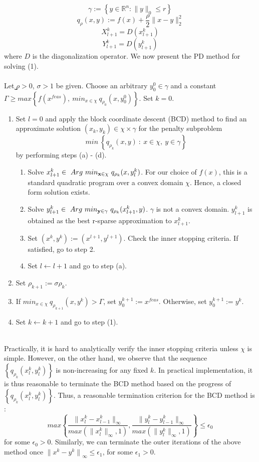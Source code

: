 \documentclass[letterpaper, 10 pt, conference]{article}
\begin{document}
$$\gamma := \left\lbrace{y\in{\mathbb{R}^n}:\|y\|_0 \leq{r}}\right\rbrace$$
$$q_{\rho}(x,y):=f(x)+\frac{\rho}{2}\|x-y\|_{2}^{2}$$
$$X_{l+1}^k=D(x_{l+1}^k)$$
$$Y_{l+1}^k=D(y_{l+1}^k)$$
where $D$ is the diagonalization operator. We now present the PD method for solving (1).
\\ \\
Let ̺$\rho > 0$, $\sigma > 1$ be given. Choose an arbitrary $y_0^0\in{\gamma}$ and a constant $\Gamma\geq max\left\lbrace{f(x^{feas}),\ min_{x\in{\chi}}\ q_{\rho_0}(x,y_0^0)}\right\rbrace$. Set $k=0$.
\begin{enumerate}
\item Set $l=0$ and apply the block coordinate descent (BCD) method to find an approximate solution $(x_k,y_k)\in \chi \times \gamma$ for the penalty subproblem
\begin{equation}
min\ \left\lbrace{q_{\rho_k}(x,y)\ :\ x\in\chi,\ y\in{{\gamma}}}\right\rbrace 
\end{equation}
by performing steps (a) - (d).
\begin{enumerate}
\item Solve $ x_{l+1}^k \in\ Arg\ min_{\bf x\in{\chi}}\ q_{\rho_k}(x,y_l^k)$. For our choice of $f(x)$, this is a standard quadratic program over a convex domain $\chi$. Hence, a closed form solution exists. 
\item Solve $ y_{l+1}^k \in\ Arg\ min_{\bf y\in{\gamma}}\ q_{\rho_k}(x_{l+1}^k,y)$. $\gamma$ is not a convex domain. $y^k_{l+1}$ is obtained as the best r-sparse approximation to $x^k_{l+1}$.
\item Set $(x^k,y^k):=(x^{l+1},y^{l+1})$. Check the inner stopping criteria. If satisfied, go to step 2.
\item Set $l\leftarrow l+1$ and go to step (a).
\end{enumerate}

\item Set $\rho_{k+1}:=\sigma\rho_k.$
\item If $min_{x\in\chi}\ q_{\rho_{k+1}}(x,y^k)>\Gamma$, set $y_0^{k+1}:=x^{feas}$. Otherwise, set $y_0^{k+1}:=y^k$.
\item Set $k\leftarrow k+1$ and go to step (1).
\end{enumerate}
\ \\
Practically, it is hard to analytically verify the inner  stopping criteria unless $\chi$ is simple. However, on the other hand, we observe that the sequence $\left\lbrace{q_{\rho_k}(x_l^k,y_l^k)}\right\rbrace$ is non-increasing for any fixed $k$. In practical implementation, it is thus reasonable to terminate the BCD method based on the progress of $\left\lbrace{q_{\rho_k}(x_l^k,y_l^k)}\right\rbrace$. Thus, a reasonable termination criterion for the BCD method is :
$$max\left\lbrace{\frac{\|x_l^k-x_{l-1}^k\|_{\infty}}{max(\|x_l^k\|_{\infty},1)},\frac{\|y_l^k-y_{l-1}^k\|_{\infty}}{max(\|y_l^k\|_{\infty},1)}}\right\rbrace \leq \epsilon_0$$
for some $\epsilon_0>0$. Similarly, we can terminate the outer iterations of the above method once ${\|x^k-y^k\|}_{\infty} \leq {\epsilon}_{1}$, for some $\epsilon_1>0$.
\end{document}
